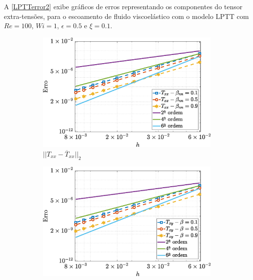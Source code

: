 A \autoref{LPTTerror2} exibe gráficos de erros representando os componentes do tensor extra-tensões, para o escoamento de fluido viscoelástico com o modelo LPTT com $Re=100$, $Wi=1$, $\epsilon = 0.5$ e $\xi = 0.1$.
\begin{figure}[H] 
    \centering
    \caption{Erro para os componentes dos tensores extra-tensões, utilizando os parâmetros $Re=100$, $Wi=1$, $\epsilon=0.5$ e $\xi=0.1$, para o escoamento de fluido viscoelástico LPTT}\label{LPTTerror2}
    \begin{subfigure}[b]{.47\textwidth}
        \includegraphics[width=\textwidth]{figures/Case12/LPTT/Errors/NormErr_2nd_Re_100_Wi_1_epsilon_0.5_xi_0.1_alphaG_0_Dt_1e-06_at_0.05_tipsim_1_MMS_12_Txx.eps}
        \caption{$||T_{xx} - \overline{T}_{xx}||_{2}$}
        \label{error_txx_2nd_Case1_LPTT_eps_05}
    \end{subfigure}
    \vspace{0.2cm}
    \qquad
    \begin{subfigure}[b]{.47\textwidth}
        \includegraphics[width=\textwidth]{figures/Case12/LPTT/Errors/NormErr_2nd_Re_100_Wi_1_epsilon_0.5_xi_0.1_alphaG_0_Dt_1e-06_at_0.05_tipsim_1_MMS_12_Txy.eps}

\end{subfigure}
\end{figure}
